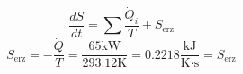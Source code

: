 

\item[c)] 
    \begin{equation}
    \frac{dS}{dt} = \sum \frac{\dot{Q}_i}{T} + S_{\text{erz}}
    \end{equation}
    \begin{equation}
    S_{\text{erz}} = - \frac{\dot{Q}}{T} = \frac{65 \text{kW}}{293.12 \text{K}} = 0.2218 \frac{\text{kJ}}{\text{K} \cdot \text{s}} = S_{\text{erz}}
    \end{equation}